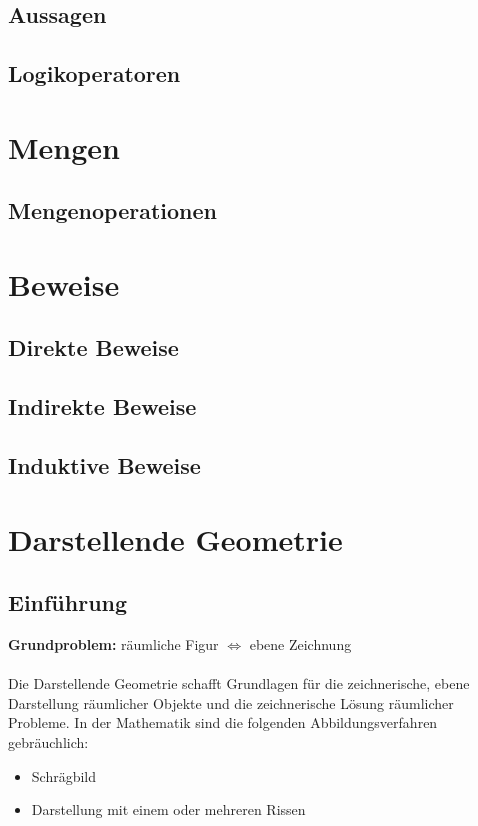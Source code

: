 \documentclass[12pt,a4paper]{scrbook}
\begin{document}
\section{Aussagen}
\section{Logikoperatoren}

\chapter{Mengen}
\section{Mengenoperationen}

\chapter{Beweise}
\section{Direkte Beweise}

\section{Indirekte Beweise}

\section{Induktive Beweise}

\chapter{Darstellende Geometrie}
\section{Einführung}
\textbf{Grundproblem:} räumliche Figur $\Leftrightarrow$ ebene Zeichnung \\\\
Die Darstellende Geometrie schafft Grundlagen für die zeichnerische, ebene Darstellung räumlicher Objekte
und die zeichnerische Lösung räumlicher Probleme. In der Mathematik sind die
folgenden Abbildungsverfahren gebräuchlich:

\begin{itemize}
  \item Schrägbild
  \item Darstellung mit einem oder mehreren Rissen
\end{itemize}
\end{document}
